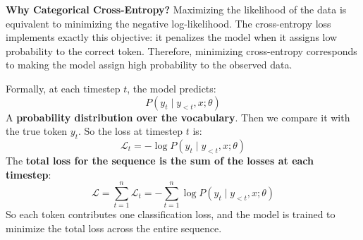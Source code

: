 \noindent
\textcolor{Green3}{ \textbf{Why Categorical Cross-Entropy?}} Maximizing the likelihood of the data is equivalent to minimizing the negative log-likelihood. The cross-entropy loss implements exactly this objective: it penalizes the model when it assigns low probability to the correct token. Therefore, minimizing cross-entropy corresponds to making the model assign high probability to the observed data.

\highspace
Formally, at each timestep $t$, the model predicts:
\begin{equation*}
    P\left(y_t \mid y_{<t}, x; \theta\right)
\end{equation*}
A \textbf{probability distribution over the vocabulary}. Then we compare it with the true token $y_t$. So the loss at timestep $t$ is:
\begin{equation*}
    \mathcal{L}_t = - \log P\left(y_t \mid y_{<t}, x; \theta\right)
\end{equation*}
The \textbf{total loss for the sequence is the sum of the losses at each timestep}:
\begin{equation*}
    \mathcal{L} = \sum_{t=1}^{n} \mathcal{L}_t = - \sum_{t=1}^{n} \log P\left(y_t \mid y_{<t}, x; \theta\right)
\end{equation*}
So each token contributes one classification loss, and the model is trained to minimize the total loss across the entire sequence.

